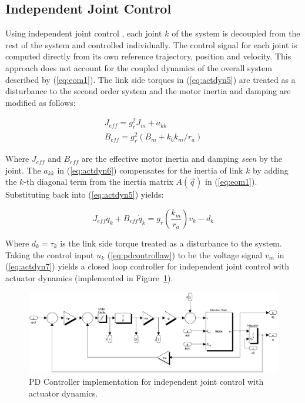 \subsection{Independent Joint Control} %
\label{sub:independent_joint_control}


Using independent joint control \cite{Sciavicco2001}, each joint $k$ of the system is decoupled from the rest of the system and controlled individually. The control signal for each joint is computed directly from its own reference trajectory, position and velocity. This approach does not account for the coupled dynamics of the overall system described by (\ref{eq:eom1}). The link side torques in (\ref{eq:actdyn5}) are treated as a disturbance to the second order system and the motor inertia and damping are modified as follows: 

\begin{equation}
	\begin{array}{l}
		{J_{eff}} = g_r^2{J_m} + {a_{kk}}\\
		{B_{eff}} = g_r^2({B_m} + {k_b}{k_m}/{r_a})
	\end{array}
	\label{eq:actdyn6}
\end{equation}

Where ${J_{eff}}$ and ${B_{eff}}$ are the effective motor inertia and damping \emph{seen} by the joint. The ${a_{kk}}$ in (\ref{eq:actdyn6}) compensates for the inertia of link $k$ by adding the $k$-th diagonal term from the inertia matrix $A(\vec{q})$ in (\ref{eq:eom1}). Substituting back into (\ref{eq:actdyn5}) yields: 

\begin{equation}
	{J_{eff}}{\ddot q_k} + {B_{eff}}{\dot q_k} = g_r^{}\left( {\frac{{{k_m}}}{{{r_a}}}} \right){v_k} - {d_k}
	\label{eq:actdyn7}
\end{equation}

Where ${d_k} = \tau _k$ is the link side torque treated as a disturbance to the system. Taking the control input $u _k$ (\ref{eq:pdcontrollaw}) to be the voltage signal $v _m$ in (\ref{eq:actdyn7}) yields a closed loop controller for independent joint control with actuator dynamics (implemented in Figure~\ref{fig:pdmotorcontroller}).

\begin{figure}[!h]
	\centering
    \includegraphics[scale=0.5]{fig/experiments/pdmotorcontroller.eps} 
  	\caption{PD Controller implementation for independent joint control with actuator dynamics.}
	\label{fig:pdmotorcontroller}
\end{figure}

